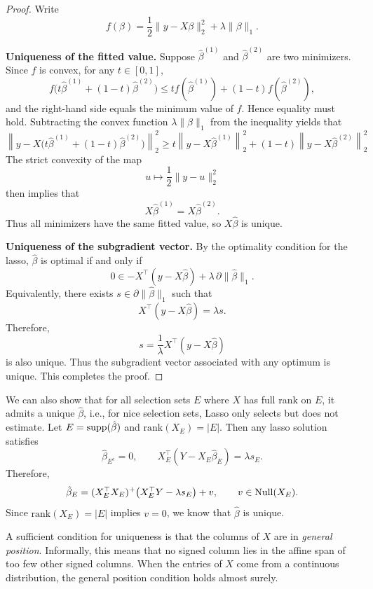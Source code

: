 \begin{proof}
Write
\[
f(\beta)=\frac12\|y-X\beta\|_2^2+\lambda\|\beta\|_1.
\]

\medskip
\noindent
\textbf{Uniqueness of the fitted value.}
Suppose $\hat\beta^{(1)}$ and $\hat\beta^{(2)}$ are two minimizers. Since $f$ is convex, for any $t\in[0,1]$,
\[
f\bigl(t\hat\beta^{(1)}+(1-t)\hat\beta^{(2)}\bigr)
\le
t f(\hat\beta^{(1)})+(1-t)f(\hat\beta^{(2)}),
\]
and the right-hand side equals the minimum value of $f$.
Hence equality must hold. Subtracting the convex function $\lambda\|\beta\|_1$ from the inequality yields that
\[
\left\|y-X\bigl(t\hat\beta^{(1)}+(1-t)\hat\beta^{(2)}\bigr)\right\|_2^2\ge t\left\|y-X\hat\beta^{(1)}\right\|_2^2+(1-t)\left\|y-X\hat\beta^{(2)}\right\|_2^2
\]
The strict convexity of the map
\[
u\mapsto \frac12\|y-u\|_2^2
\]
then implies that
\[
X\hat\beta^{(1)} = X\hat\beta^{(2)}.
\]
Thus all minimizers have the same fitted value, so $X\hat\beta$ is unique.

\medskip
\noindent
\textbf{Uniqueness of the subgradient vector.}
By the optimality condition for the lasso, $\hat\beta$ is optimal if and only if
\[
0 \in -X^\top(y-X\hat\beta)+\lambda\,\partial\|\hat\beta\|_1.
\]
Equivalently, there exists $s\in\partial\|\hat\beta\|_1$ such that
\[
X^\top(y-X\hat\beta)=\lambda s.
\]
Therefore,
\[
s=\frac{1}{\lambda}X^\top \left(y-X\hat \beta\right)
\]
is also unique. Thus the subgradient vector associated with any optimum is unique. This completes the proof.
\end{proof}
\begin{remark}
    We can also show that for all selection sets $E$ where $X$ has full rank on $E$, it admits a unique $\hat{\beta}$, i.e., for nice selection sets, Lasso only selects but does not estimate. Let $E=\operatorname{supp}(\hat\beta)$ and $\mathrm{rank}(X_E)=|E|$. Then any lasso solution satisfies
\[
\hat\beta_{E^c}=0,
\qquad
X_E^\top(Y-X_E\hat\beta_E)=\lambda s_E.
\]
Therefore,
\[
\hat\beta_E
=
(X_E^\top X_E)^+\bigl(X_E^\top Y-\lambda s_E\bigr)+v,
\qquad
v\in\mathrm{Null}(X_E).
\]
Since $\mathrm{rank}(X_E)=|E|$ implies $v=0$, we know that $\hat\beta$ is unique.
\end{remark}


\begin{remark}
    A sufficient condition for uniqueness is that the columns of $X$ are in \emph{general position}.  
Informally, this means that no signed column lies in the affine span of too few other signed columns.  
When the entries of $X$ come from a continuous distribution, the general position condition holds almost surely.
\end{remark}

